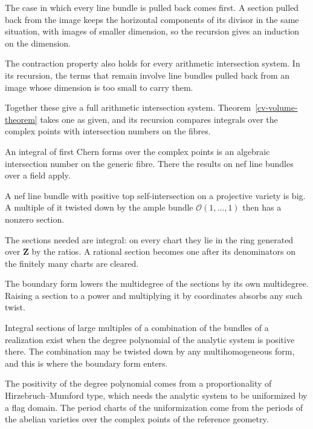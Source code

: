 The case in which every line bundle is pulled back comes first. A section pulled back from the image keeps the
horizontal components of its divisor in the same situation, with images of smaller dimension, so the recursion gives
an induction on the dimension.

The contraction property also holds for every arithmetic intersection system. In its recursion, the terms that
remain involve line bundles pulled back from an image whose dimension is too small to carry them.

Together these give a full arithmetic intersection system. Theorem~\ref{cv-volume-theorem} takes one as given, and
its recursion compares integrals over the complex points with intersection numbers on the fibres.

An integral of first Chern forms over the complex points is an algebraic intersection number on the generic
fibre. There the results on nef line bundles over a field apply.

A nef line bundle with positive top self-intersection on a projective variety is big. A multiple of it twisted
down by the ample bundle $\mathcal O(1,\dots,1)$ then has a nonzero section.

The sections needed are integral: on every chart they lie in the ring generated over $\mathbf Z$ by the ratios.
A rational section becomes one after its denominators on the finitely many charts are cleared.

The boundary form lowers the multidegree of the sections by its own multidegree. Raising a section to a power
and multiplying it by coordinates absorbs any such twist.

Integral sections of large multiples of a combination of the bundles of a realization exist when the degree
polynomial of the analytic system is positive there. The combination may be twisted down by any multihomogeneous
form, and this is where the boundary form enters.

The positivity of the degree polynomial comes from a proportionality of Hirzebruch--Mumford type, which needs the
analytic system to be uniformized by a flag domain. The period charts of the uniformization come from the periods of the abelian
varieties over the complex points of the reference geometry.

